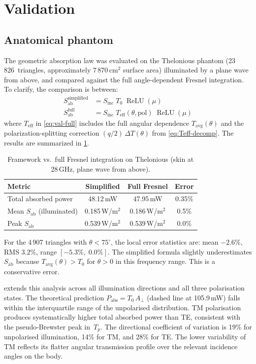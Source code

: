 \documentclass[11pt,a4paper]{article}
\theoremstyle{definition}      %
\newcommand{\Sinc}{S_{\mathrm{inc}}}
\newcommand{\Sab}{S_{\mathrm{ab}}}
\newcommand{\Teff}{T_{\mathrm{eff}}}
\newcommand{\Tavg}{T_{\mathrm{avg}}}
\newcommand{\Aperp}{A_{\perp}}
\DeclareMathOperator{\ReLU}{ReLU}
\begin{document}
\section{Validation}\label{sec:validation}

\subsection{Anatomical phantom}\label{sec:phantom}

The geometric absorption law was evaluated on the Thelonious phantom
(23\,826~triangles, approximately 7\,870\,cm$^2$ surface area)
illuminated by a plane wave from above, and compared against the full
angle-dependent Fresnel integration. To clarify, the comparison is between:
\begin{align}
  \Sab^{\mathrm{simplified}} &= \Sinc\;T_0\;\ReLU(\mu) \label{eq:val-simp} \\
  \Sab^{\mathrm{full}} &= \Sinc\;\Teff(\theta, \text{pol})\;\ReLU(\mu) \label{eq:val-full}
\end{align}
where $\Teff$ in \cref{eq:val-full} includes the full angular dependence $\Tavg(\theta)$ and the polarization-splitting correction $(q/2)\,\Delta T(\theta)$ from \cref{eq:Teff-decomp}.
The results are summarized in \cref{tab:phantom}.

\begin{table}[!htbp]
\centering
\caption{Framework vs.\ full Fresnel integration on Thelonious
  (skin at 28\,GHz, plane wave from above).}\label{tab:phantom}
\begin{tabular}{lccc}
\toprule
Metric & Simplified & Full Fresnel & Error \\
\midrule
Total absorbed power  & 48.12\,mW & 47.95\,mW & 0.35\% \\
Mean $\Sab$ (illuminated) & 0.185\,W/m$^2$ & 0.186\,W/m$^2$ & 0.5\% \\
Peak $\Sab$           & 0.539\,W/m$^2$ & 0.539\,W/m$^2$ & 0.0\% \\
\bottomrule
\end{tabular}
\end{table}

For the 4\,907 triangles with $\theta<75^\circ$, the local error
statistics are: mean $-2.6\%$, RMS $3.2\%$, range
$[-5.3\%,\;0.0\%]$.  The simplified formula slightly underestimates
$\Sab$ because $\Tavg(\theta)>T_0$ for $\theta>0$ in this frequency
range. This is a conservative error.

 extends this analysis across all illumination
directions and all three polarisation states.  The theoretical
prediction $P_{\mathrm{abs}} = T_0\,\Aperp$ (dashed line at
105.9\,mW) falls within the interquartile range of the unpolarised
distribution.  TM polarisation produces systematically higher total
absorbed power than TE, consistent with the pseudo-Brewster peak
in~$T_p$.  The directional coefficient of variation is 19\% for
unpolarised illumination, 14\% for TM, and 28\% for TE.  The lower
variability of TM reflects its flatter angular transmission profile
over the relevant incidence angles on the body.
\end{document}
